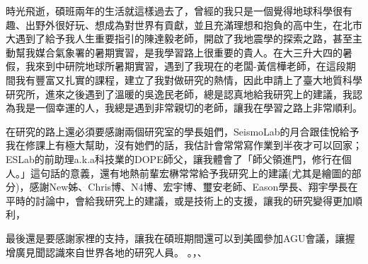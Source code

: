 
\begin{acknowledgement}
    時光飛逝，碩班兩年的生活就這樣過去了，曾經的我只是一個覺得地球科學很有趣、出野外很好玩、想成為對世界有貢獻，並且充滿理想和抱負的高中生，在北市大遇到了給予我人生重要指引的陳達毅老師，開啟了我地震學的探索之路，甚至主動幫我媒合氣象署的暑期實習，是我學習路上很重要的貴人。在大三升大四的暑假，我來到中研院地球所暑期實習，遇到了我現在的老闆-黃信樺老師，在這段期間我有豐富又扎實的課程，建立了我對做研究的熱情，因此申請上了臺大地質科學研究所，進來之後遇到了溫暖的吳逸民老師，總是認真地給我研究上的建議，我認為我是一個幸運的人，我總是遇到非常親切的老師，讓我在學習之路上非常順利。

在研究的路上還必須要感謝兩個研究室的學長姐們，SeismoLab的月合跟佳悅給予我在修課上有極大幫助，沒有她們的話，我估計會常常寫作業到半夜才可以回家；ESLab的前助理a.k.a科技業的DOPE師父，讓我體會了「師父領進門，修行在個人。」這句話的意義，還有地熱前輩宏楙常常給予我研究上的建議(尤其是繪圖的部分)，感謝New姊、Chris博、N4博、宏宇博、璽安老師、Eason學長、翔宇學長在平時的討論中，會給我研究上的建議，或是技術上的支援，讓我的研究變得更加順利，

最後還是要感謝家裡的支持，讓我在碩班期間還可以到美國參加AGU會議，讓握增廣見聞認識來自世界各地的研究人員。
    。，、

\end{acknowledgement}